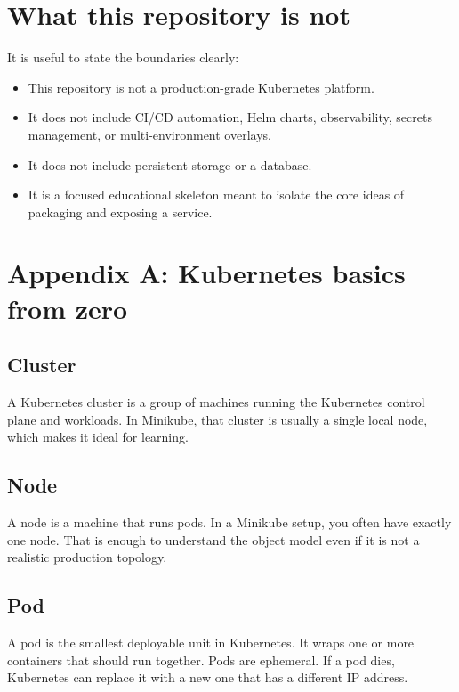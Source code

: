\documentclass[11pt,a4paper]{article}
\begin{document}
\section{What this repository is not}

It is useful to state the boundaries clearly:

\begin{itemize}
\item This repository is not a production-grade Kubernetes platform.
\item It does not include CI/CD automation, Helm charts, observability, secrets management, or multi-environment overlays.
\item It does not include persistent storage or a database.
\item It is a focused educational skeleton meant to isolate the core ideas of packaging and exposing a service.
\end{itemize}

\newpage
\appendix

\section{Appendix A: Kubernetes basics from zero}

\subsection{Cluster}

A Kubernetes cluster is a group of machines running the Kubernetes control plane and workloads. In Minikube, that cluster is usually a single local node, which makes it ideal for learning.

\subsection{Node}

A node is a machine that runs pods. In a Minikube setup, you often have exactly one node. That is enough to understand the object model even if it is not a realistic production topology.

\subsection{Pod}

A pod is the smallest deployable unit in Kubernetes. It wraps one or more containers that should run together. Pods are ephemeral. If a pod dies, Kubernetes can replace it with a new one that has a different IP address.
\end{document}
